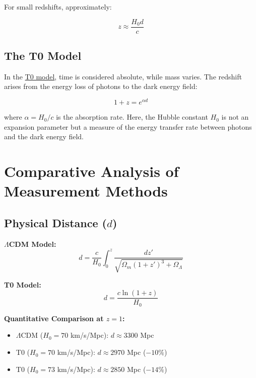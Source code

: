 \documentclass[a4paper,12pt]{article}
\theoremstyle{definition}
\theoremstyle{remark}
\newcommand{\repobase}{https://github.com/jpascher/T0-Time-Mass-Duality/tree/main/2/}
\begin{document}
	For small redshifts, approximately:
	
	\begin{equation}
		z \approx \frac{H_0 d}{c}
	\end{equation}
	
	\subsection{The T0 Model}
	
	In the {\small\href{\repobase/pdf/English/Wesentliche mathematische Formalismen der Zeit-Masse-Dualitätstheorie mit Lagrange-Dichten_en.pdf}{T0 model}}, time is considered absolute, while mass varies. The redshift arises from the energy loss of photons to the dark energy field:
	
	\begin{equation}
		1 + z = e^{\alpha d}
	\end{equation}
	
	where $\alpha = H_0/c$ is the absorption rate. Here, the Hubble constant $H_0$ is not an expansion parameter but a measure of the energy transfer rate between photons and the dark energy field.
	
	\section{Comparative Analysis of Measurement Methods}
	
	\subsection{Physical Distance ($d$)}
	
	\textbf{$\Lambda$CDM Model:}
	\begin{equation}
		d = \frac{c}{H_0} \int_0^z \frac{dz'}{\sqrt{\Omega_m (1 + z')^3 + \Omega_\Lambda}}
	\end{equation}
	
	\textbf{T0 Model:}
	\begin{equation}
		d = \frac{c \ln(1 + z)}{H_0}
	\end{equation}
	
	\textbf{Quantitative Comparison at $z = 1$:}
	\begin{itemize}
		\item $\Lambda$CDM ($H_0 = 70$ km/s/Mpc): $d \approx 3300$ Mpc
		\item T0 ($H_0 = 70$ km/s/Mpc): $d \approx 2970$ Mpc ($-10\%$)
		\item T0 ($H_0 = 73$ km/s/Mpc): $d \approx 2850$ Mpc ($-14\%$)
	\end{itemize}
	
\end{document}
